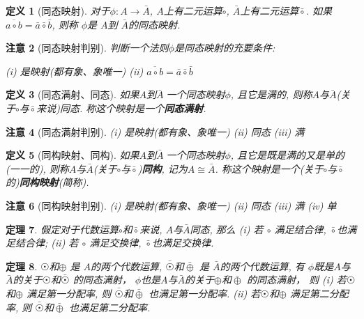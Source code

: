 \documentclass[UTF8]{ctexart}
\newtheorem{Definition}{定义}%
\newtheorem{Theorem}[Definition]{定理}
\newtheorem{Remark}[Definition]{注意}
\begin{document}
\begin{Definition}[同态映射]
对于$\phi: A \rightarrow \bar{A}$, $A$上有二元运算$\circ$, $\bar{A}$上有二元运算$\bar{\circ}$.
如果
$ \overline{a \circ b} = \bar{a} \bar{\circ} \bar{b}$, 则称 $\phi$是 $A$到 $\bar{A}$的同态映射.
\end{Definition}

\begin{Remark}[同态映射判别]
 判断一个法则$\phi$是同态映射的充要条件: \\

\centerline{(i) 是映射(都有象、象唯一) (ii) $ \overline{a \circ b} = \bar{a} \bar{\circ} \bar{b}$}
\end{Remark}

\begin{Definition}[同态满射、同态]
如果$A$到$\bar{A}\;${}\;一个同态映射$\phi$, 且它是满的, 则称$A$与$\bar{A}$(关于$\circ$与$\bar{\circ}$来说)同态. 称这个映射是一个\textbf{同态满射}.
\end{Definition}

\begin{Remark}[同态满射判别]
(i) 是映射(都有象、象唯一) (ii) 同态 (iii) 满
\end{Remark}


\begin{Definition}[同构映射、同构]
如果$A$到$\bar{A}\;${}\;一个同态映射$\phi$, 且它是既是满的又是单的(一一的), 则称$A$与$\bar{A}$(关于$\circ$与$\bar{\circ}$)\textbf{同构}, 记为$A \cong
 \bar{A}$. 称这个映射是一个(关于$\circ$与$\bar{\circ}$的)\textbf{同构映射}(简称).
\end{Definition}

\begin{Remark}[同构映射判别]
(i) 是映射(都有象、象唯一) (ii) 同态 (iii) 满 (iv) 单
\end{Remark}

\begin{Theorem}
假定对于代数运算$\circ$和$\bar{\circ}$来说, $A$与$\bar{A}$同态, 那么
(i) 若 $\circ$ 满足结合律, $\bar{\circ}$也满足结合律;
(ii) 若 $\circ$ 满足交换律, $\bar{\circ}$也满足交换律.
\end{Theorem}

\begin{Theorem}
$ \astrosun $和$ \oplus $ 是 $A$的两个代数运算, 
$ \bar{\astrosun} $和$\bar{\oplus} $ 是 $\bar{A}$的两个代数运算,
有
$\phi$既是$A$与$\bar{A}$的关于$ \astrosun $和$\bar{\astrosun}$ 的同态满射，
$\phi$也是$A$与$\bar{A}$的关于$ \oplus $和$\bar{\oplus}$ 的同态满射，
则 
(i) 若$ \astrosun$和$ \oplus $  满足第一分配率, 则 $ \bar{\astrosun} $和$\bar{\oplus} $ 也满足第一分配率.
(ii) 若$ \astrosun$和$\oplus $  满足第二分配率, 则 $ \bar{\astrosun} $和$\bar{\oplus} $ 也满足第二分配率.
\end{Theorem}
\end{document}
